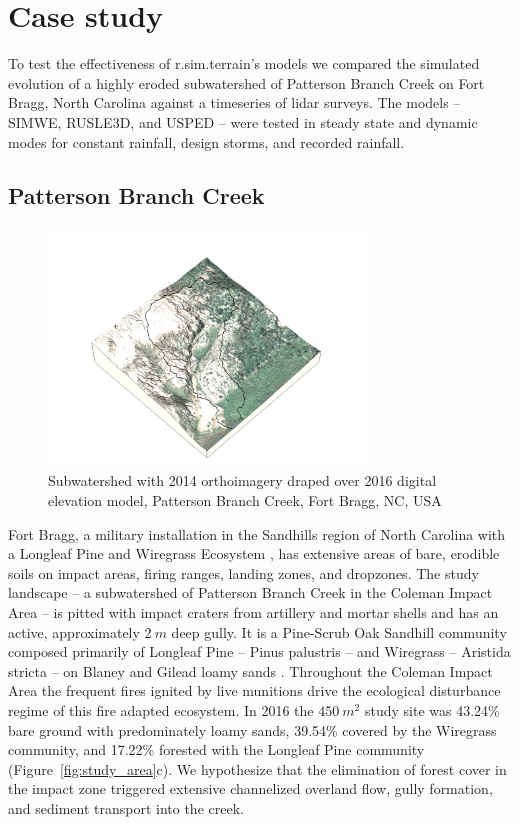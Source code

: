 \documentclass[esurf, manuscript]{copernicus}
\begin{document}
\section{Case study} 

To test the effectiveness of r.sim.terrain's models 
we compared the simulated evolution
of a highly eroded subwatershed of 
Patterson Branch Creek on Fort Bragg, North Carolina
against a timeseries of lidar surveys.
The models -- SIMWE, RUSLE3D, and USPED --
were tested in steady state and dynamic modes
for constant rainfall, design storms, and recorded rainfall.

\subsection{Patterson Branch Creek}

\begin{figure}
\centering
\includegraphics[width=0.75\textwidth]{../images/sample_data_3d/naip_2014.png}
\caption{Subwatershed with 2014 orthoimagery draped over 2016 digital elevation model, Patterson Branch Creek, Fort Bragg, NC, USA}
\label{fig:3d}
\end{figure}

Fort Bragg, a military installation 
in the Sandhills region of North Carolina %
with a Longleaf Pine and Wiregrass Ecosystem \citep{Sorrie2006},
has extensive areas of bare, erodible soils
on impact areas, firing ranges, landing zones, and dropzones. 
%
The study landscape
-- a subwatershed of Patterson Branch Creek 
in the Coleman Impact Area --
is pitted with impact craters from artillery and mortar shells
and has an active, approximately $2~m$ deep gully. 
%
It is a Pine-Scrub Oak Sandhill community
composed primarily of Longleaf Pine -- Pinus palustris --
and Wiregrass -- Aristida stricta --
on Blaney and Gilead loamy sands 
\citep{Sorrie2004}. 
%
Throughout the Coleman Impact Area
the frequent fires ignited by live munitions
drive the ecological disturbance regime
of this fire adapted ecosystem.
%
In 2016 the  $450~m^{2}$ study site was
43.24\% bare ground with predominately loamy sands,
39.54\% covered by the Wiregrass community, and
17.22\% forested with the Longleaf Pine community 
(Figure~\ref{fig:study_area}c). 
%
We hypothesize that the elimination of forest cover
in the impact zone
triggered extensive channelized overland flow,
gully formation, and sediment transport into the creek. 
\end{document}
